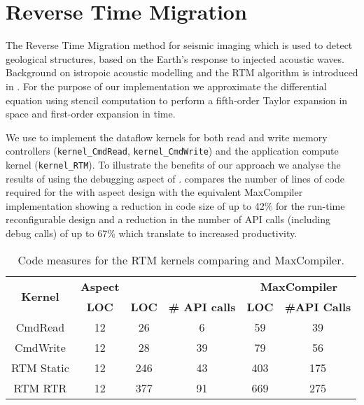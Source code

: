 \section{Reverse Time Migration}
\label{sec:RTM}
The Reverse Time Migration method for seismic imaging which is used to
detect geological structures, based on the Earth's response to
injected acoustic waves. Background on istropoic acoustic modelling
and the RTM algorithm is introduced in . For the
purpose of our implementation we approximate the differential equation
using stencil computation to perform a fifth-order Taylor expansion in
space and first-order expansion in time.

We use \FAST{} to implement the dataflow kernels for both read and
write memory controllers (\texttt{kernel\_CmdRead},
\texttt{kernel\_CmdWrite}) and the application compute kernel
(\texttt{kernel\_RTM}).  To illustrate the benefits of our approach we
analyse the results of using the debugging aspect of
.  compares the number of lines
of code required for the \FAST{} with aspect design with the
equivalent MaxCompiler implementation showing a reduction in code size
of up to 42\% for the run-time reconfigurable design and a reduction
in the number of API calls (including debug calls) of up to 67\% which
translate to increased productivity.

\begin{table}[!h]

  \centering
  \begin{tabular}{c|ccc|cc}
    \hline
    \multirow{2}{*}{\bf{Kernel}} & \bf{Aspect } & \multicolumn{2}{c|}{\bf{\FAST{}}} & \multicolumn{2}{c}{\bf{MaxCompiler}}                   \\
    \                            & \bf{LOC}     & \bf{LOC}                       & \bf{\# API calls} & \bf{LOC} & \bf{\#API Calls} \\
    \hline \hline
    CmdRead                      & 12           & 26                             &      6         & 59       &      39        \\
    CmdWrite                     & 12           & 28                             &      39        & 79      &       56         \\
    RTM Static                   & 12           & 246                            &     43         & 403     &       175        \\
    RTM RTR                      & 12           & 377                            &     91         & 669     &       275       \\
  \end{tabular}
  \caption{Code measures for the RTM kernels comparing \FAST{} and
    MaxCompiler.}
  \label{table:loc}
\end{table}

